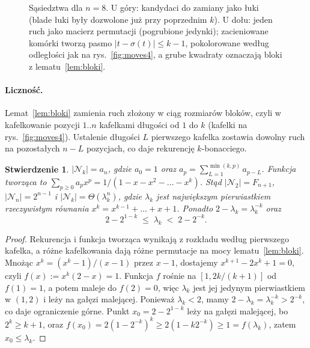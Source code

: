 \documentclass[letterpaper]{article} %
\newtheorem{proposition}{Stwierdzenie}
\theoremstyle{definition}
\newcommand{\N}{\mathcal{N}}
\begin{document}
\begin{figure}[t]
{%
}
\caption{Sąsiedztwa dla $n=8$. U góry: kandydaci do zamiany jako łuki
(blade łuki były dozwolone już przy poprzednim $k$). U dołu: jeden ruch
jako macierz permutacji (pogrubione jedynki); zacieniowane komórki tworzą pasmo
$|t-\sigma(t)|\leq k-1$, pokolorowane według odległości jak na rys.~\ref{fig:moves4}, a grube kwadraty oznaczają bloki
z lematu~\ref{lem:bloki}.}
\label{fig:plansze}
\end{figure}

\paragraph{Liczność.} Lemat~\ref{lem:bloki} zamienia ruch złożony w ciąg
rozmiarów bloków, czyli w kafelkowanie pozycji $1..n$ kafelkami długości od $1$ do $k$ (kafelki na rys.~\ref{fig:moves4}). Ustalenie długości $L$ pierwszego
kafelka zostawia dowolny ruch na pozostałych $n-L$ pozycjach, co daje rekurencję $k$-bonacciego.

\begin{proposition}\label{prop:licznosc}
$|\N_k|=a_n$, gdzie $a_0=1$ oraz $a_p=\sum_{L=1}^{\min(k,p)}a_{p-L}$.
Funkcja tworząca to $\sum_{p\geq 0}a_px^p=1/(1-x-x^2-\dots-x^k)$.
Stąd $|\N_2|=F_{n+1}$, $|\N_n|=2^{n-1}$ i $|\N_k|=\Theta(\lambda_k^n)$,
gdzie $\lambda_k$ jest największym pierwiastkiem rzeczywistym równania
$x^k=x^{k-1}+\dots+x+1$. Ponadto $2-\lambda_k=\lambda_k^{-k}$ oraz
\begin{equation}\label{eq:lambda}
2-2^{1-k}\;\leq\;\lambda_k\;<\;2-2^{-k}.
\end{equation}
\end{proposition}
\begin{proof}
Rekurencja i funkcja tworząca wynikają z rozkładu według pierwszego
kafelka, a różne kafelkowania dają różne permutacje na mocy
lematu~\ref{lem:bloki}. Mnożąc $x^k=(x^k-1)/(x-1)$ przez $x-1$,
dostajemy $x^{k+1}-2x^k+1=0$, czyli $f(x):=x^k(2-x)=1$. Funkcja $f$
rośnie na $[1,2k/(k+1)]$ od $f(1)=1$, a potem maleje do $f(2)=0$, więc
$\lambda_k$ jest jej jedynym pierwiastkiem w $(1,2)$ i leży na gałęzi
malejącej. Ponieważ $\lambda_k<2$, mamy
$2-\lambda_k=\lambda_k^{-k}>2^{-k}$, co daje ograniczenie górne.
Punkt $x_0=2-2^{1-k}$ leży na gałęzi malejącej, bo $2^k\geq k+1$, oraz
$f(x_0)=2(1-2^{-k})^k\geq 2(1-k2^{-k})\geq 1=f(\lambda_k)$, zatem
$x_0\leq\lambda_k$.
\end{proof}
\end{document}
